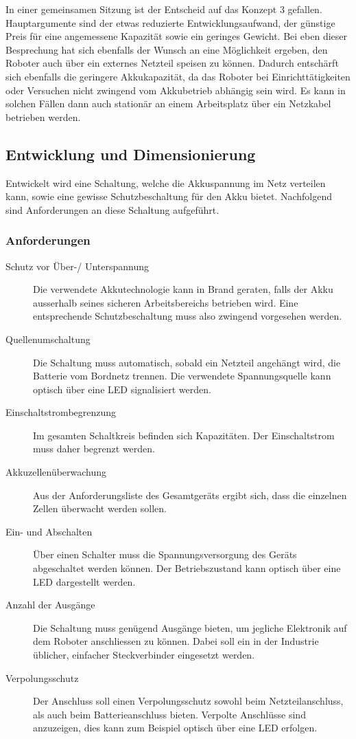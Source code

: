 \documentclass[main.tex]{subfiles} %
\begin{document}
In einer gemeinsamen Sitzung ist der Entscheid auf das Konzept 3 gefallen.
Hauptargumente sind der etwas reduzierte Entwicklungsaufwand, der günstige
Preis für eine angemessene Kapazität sowie ein geringes Gewicht. Bei eben
dieser Besprechung hat sich ebenfalls der Wunsch an eine Möglichkeit ergeben,
den Roboter auch über ein externes Netzteil speisen zu können. Dadurch
entschärft sich ebenfalls die geringere Akkukapazität, da das Roboter bei
Einrichttätigkeiten oder Versuchen nicht zwingend vom Akkubetrieb abhängig sein
wird. Es kann in solchen Fällen dann auch stationär an einem Arbeitsplatz über
ein Netzkabel betrieben werden.

\subsection*{Entwicklung und Dimensionierung}

Entwickelt wird eine Schaltung, welche die Akkuspannung im Netz verteilen kann,
sowie eine gewisse Schutzbeschaltung für den Akku bietet. Nachfolgend sind
Anforderungen an diese Schaltung aufgeführt.

\subsubsection*{Anforderungen}
\begin{description}
    \item[Schutz vor Über-/ Unterspannung] Die verwendete Akkutechnologie kann in Brand
          geraten, falls der Akku ausserhalb seines sicheren Arbeitsbereichs betrieben
          wird. Eine entsprechende Schutzbeschaltung muss also zwingend vorgesehen
          werden.
    \item[Quellenumschaltung] Die Schaltung muss automatisch, sobald ein Netzteil
          angehängt wird, die Batterie vom Bordnetz trennen. Die verwendete
          Spannungsquelle kann optisch über eine LED signalisiert werden.
    \item[Einschaltstrombegrenzung] Im gesamten Schaltkreis befinden sich Kapazitäten.
          Der Einschaltstrom muss daher begrenzt werden.
    \item[Akkuzellenüberwachung] Aus der Anforderungsliste des Gesamtgeräts ergibt sich,
          dass die einzelnen Zellen überwacht werden sollen.
    \item[Ein- und Abschalten] Über einen Schalter muss die Spannungsversorgung des
          Geräts abgeschaltet werden können. Der Betriebszustand kann optisch über eine
          LED dargestellt werden.
    \item[Anzahl der Ausgänge] Die Schaltung muss genügend Ausgänge bieten, um jegliche
          Elektronik auf dem Roboter anschliessen zu können. Dabei soll ein in der
          Industrie üblicher, einfacher Steckverbinder eingesetzt werden.
    \item[Verpolungsschutz] Der Anschluss soll einen Verpolungsschutz sowohl beim
          Netzteilanschluss, als auch beim Batterieanschluss bieten. Verpolte Anschlüsse
          sind anzuzeigen, dies kann zum Beispiel optisch über eine LED erfolgen.
\end{description}
\end{document}
